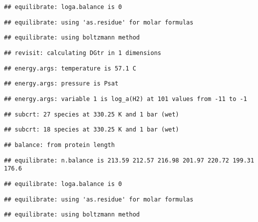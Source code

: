 \documentclass[]{article}
\begin{document}
\begin{verbatim}
## equilibrate: loga.balance is 0
\end{verbatim}

\begin{verbatim}
## equilibrate: using 'as.residue' for molar formulas
\end{verbatim}

\begin{verbatim}
## equilibrate: using boltzmann method
\end{verbatim}

\begin{verbatim}
## revisit: calculating DGtr in 1 dimensions
\end{verbatim}

\begin{verbatim}
## energy.args: temperature is 57.1 C
\end{verbatim}

\begin{verbatim}
## energy.args: pressure is Psat
\end{verbatim}

\begin{verbatim}
## energy.args: variable 1 is log_a(H2) at 101 values from -11 to -1
\end{verbatim}

\begin{verbatim}
## subcrt: 27 species at 330.25 K and 1 bar (wet)
\end{verbatim}

\begin{verbatim}
## subcrt: 18 species at 330.25 K and 1 bar (wet)
\end{verbatim}

\begin{verbatim}
## balance: from protein length
\end{verbatim}

\begin{verbatim}
## equilibrate: n.balance is 213.59 212.57 216.98 201.97 220.72 199.31 176.6
\end{verbatim}

\begin{verbatim}
## equilibrate: loga.balance is 0
\end{verbatim}

\begin{verbatim}
## equilibrate: using 'as.residue' for molar formulas
\end{verbatim}

\begin{verbatim}
## equilibrate: using boltzmann method
\end{verbatim}
\end{document}
